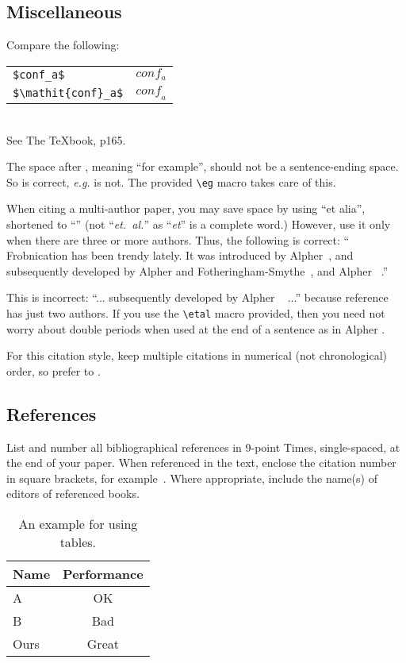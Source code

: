 \documentclass[10pt,twocolumn,letterpaper]{article}
\begin{document}
\subsection{Miscellaneous}

\noindent
Compare the following:\\
\begin{tabular}{ll}
 \verb'$conf_a$' &  $conf_a$ \\
 \verb'$\mathit{conf}_a$' & $\mathit{conf}_a$
\end{tabular}\\
See The \TeX book, p165.

The space after \eg, meaning ``for example'', should not be a
sentence-ending space. So \eg is correct, {\em e.g.} is not.  The provided
\verb'\eg' macro takes care of this.

When citing a multi-author paper, you may save space by using ``et alia'',
shortened to ``\etal'' (not ``{\em et.\ al.}'' as ``{\em et}'' is a complete word.)
However, use it only when there are three or more authors.  Thus, the
following is correct: ``
   Frobnication has been trendy lately.
   It was introduced by Alpher~\cite{Alpher02}, and subsequently developed by
   Alpher and Fotheringham-Smythe~\cite{Alpher03}, and Alpher \etal~\cite{Alpher04}.''

This is incorrect: ``... subsequently developed by Alpher \etal~\cite{Alpher03} ...''
because reference~\cite{Alpher03} has just two authors.  If you use the
\verb'\etal' macro provided, then you need not worry about double periods
when used at the end of a sentence as in Alpher \etal.

For this citation style, keep multiple citations in numerical (not
chronological) order, so prefer \cite{Alpher03,Alpher02,Authors12} to
\cite{Alpher02,Alpher03,Authors12}.

\subsection{References}

List and number all bibliographical references in 9-point Times,
single-spaced, at the end of your paper. When referenced in the text,
enclose the citation number in square brackets, for
example~\cite{Authors12}.  Where appropriate, include the name(s) of
editors of referenced books.

\begin{table}
\begin{center}
\begin{tabular}{|l|c|}
\hline
Name & Performance \\
\hline\hline
A & OK\\
B & Bad \\
Ours & Great\\
\hline
\end{tabular}
\end{center}
\caption{An example for using tables.}
\end{table}
\end{document}
